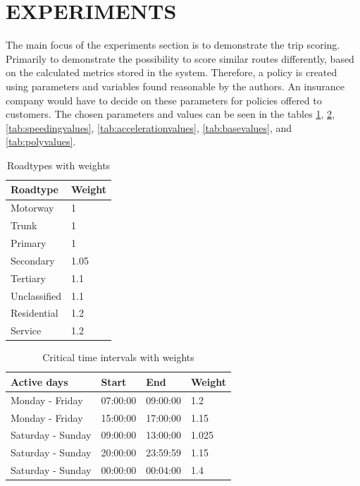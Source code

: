 \section{EXPERIMENTS}\label{sec:expe}
The main focus of the experiments section is to demonstrate the trip scoring. Primarily to demonstrate the possibility to score similar routes differently, based on the calculated metrics stored in the system. Therefore, a policy is created using parameters and variables found reasonable by the authors. An insurance company would have to decide on these parameters for policies offered to customers. The chosen parameters and values can be seen in the tables \ref{tab:roadtypevalues}, \ref{tab:crittimevalues}, \ref{tab:speedingvalues}, \ref{tab:accelerationvalues}, \ref{tab:basevalues}, and \ref{tab:polyvalues}.

\begin{table}
    \centering
    \begin{tabular}{ll}
    \textbf{Roadtype} & \textbf{Weight} \\ \hline
    Motorway          & 1               \\
    Trunk             & 1               \\
    Primary           & 1               \\
    Secondary         & 1.05            \\
    Tertiary          & 1.1             \\
    Unclassified      & 1.1             \\
    Residential       & 1.2             \\
    Service           & 1.2             \\ \hline
    \end{tabular}
    \caption{Roadtypes with weights}
    \label{tab:roadtypevalues}
\end{table}

\begin{table}
    \centering
    \begin{tabular}{llll}
    \textbf{Active days} & \textbf{Start} & \textbf{End} & \textbf{Weight} \\ \hline
    Monday - Friday      & 07:00:00       & 09:00:00     & 1.2             \\
    Monday - Friday      & 15:00:00       & 17:00:00     & 1.15            \\
    Saturday - Sunday    & 09:00:00       & 13:00:00     & 1.025           \\
    Saturday - Sunday    & 20:00:00       & 23:59:59     & 1.15            \\
    Saturday - Sunday    & 00:00:00       & 00:04:00     & 1.4             \\ \hline
    \end{tabular}
    \caption{Critical time intervals with weights}
    \label{tab:crittimevalues}
\end{table}

